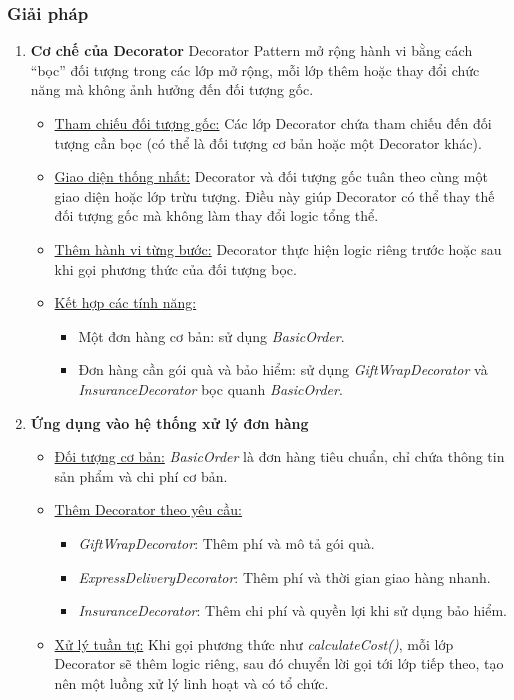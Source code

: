\subsubsection{Giải pháp}
\begin{enumerate}
    \item \textbf{Cơ chế của Decorator}\newline
    Decorator Pattern mở rộng hành vi bằng cách “bọc” đối tượng trong các lớp mở rộng, mỗi lớp thêm hoặc thay đổi chức năng mà không ảnh hưởng đến đối tượng gốc.
    \begin{itemize}
        \item \underline{Tham chiếu đối tượng gốc:} Các lớp Decorator chứa tham chiếu đến đối tượng cần bọc (có thể là đối tượng cơ bản hoặc một Decorator khác).
        \item \underline{Giao diện thống nhất:} Decorator và đối tượng gốc tuân theo cùng một giao diện hoặc lớp trừu tượng. Điều này giúp Decorator có thể thay thế đối tượng gốc mà không làm thay đổi logic tổng thể.
        \item \underline{Thêm hành vi từng bước:} Decorator thực hiện logic riêng trước hoặc sau khi gọi phương thức của đối tượng bọc.
        \item \underline{Kết hợp các tính năng:}
        \begin{itemize}
            \item Một đơn hàng cơ bản: sử dụng \textit{BasicOrder}.
            \item Đơn hàng cần gói quà và bảo hiểm: sử dụng \textit{GiftWrapDecorator} và \textit{InsuranceDecorator} bọc quanh \textit{BasicOrder}.
        \end{itemize}
    \end{itemize}
    
    \item \textbf{Ứng dụng vào hệ thống xử lý đơn hàng}
    \begin{itemize}
        \item \underline{Đối tượng cơ bản:} \textit{BasicOrder} là đơn hàng tiêu chuẩn, chỉ chứa thông tin sản phẩm và chi phí cơ bản.
        \item \underline{Thêm Decorator theo yêu cầu:}
        \begin{itemize}
            \item \textit{GiftWrapDecorator}: Thêm phí và mô tả gói quà.
            \item \textit{ExpressDeliveryDecorator}: Thêm phí và thời gian giao hàng nhanh.
            \item \textit{InsuranceDecorator}: Thêm chi phí và quyền lợi khi sử dụng bảo hiểm.
        \end{itemize}
        \item \underline{Xử lý tuần tự:} Khi gọi phương thức như \textit{calculateCost()}, mỗi lớp Decorator sẽ thêm logic riêng, sau đó chuyển lời gọi tới lớp tiếp theo, tạo nên một luồng xử lý linh hoạt và có tổ chức.
    \end{itemize}
\end{enumerate}

